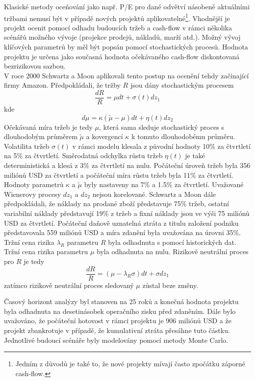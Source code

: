 \documentclass[a4paper]{book}
\begin{document}
Klasické metody oceňování jako např. P/E pro dané odvětví násobené aktuálními tržbami nemusí být v případě nových projektů aplikovatelné\footnote{Jedním z důvodů je také to, že nové projekty mívají často zpočátku záporné cash-flow.}. Vhodnější je projekt ocenit pomocí odhadu budoucích tržeb a cash-flow v rámci několika scénářů možného vývoje (projekce prodejů, nákladů, marží atd.). Možný vývoj klíčových parametrů by měl být popsán pomocí stochastických procesů. Hodnota projektu je určena jako současná hodnota očekávaného cash-flow diskontovaná bezrizikovou sazbou.\\

V roce 2000 Schwartz a Moon aplikovali tento postup na ocenění tehdy začínající firmy Amazon. Předpokládali, že tržby $R$ jsou dány stochastickým procesem
\begin{equation*}
\frac{dR}{R}=\mu dt + \sigma(t)dz_1
\end{equation*}
kde
\begin{equation*}
d \mu = \kappa(\tilde{\mu} - \mu)dt + \eta(t)dz_2
\end{equation*}
Očekávaná míra tržeb je tedy $\mu$, která sama sleduje stochastický proces s dlouhodobým průměrem $\tilde{\mu}$ a kovergencí $\kappa$ k tomuto dlouhodobému průměru. Volatilita tržeb $\sigma(t)$ v rámci modelu klesala z původní hodnoty 10\% za čtvrtletí na 5\% za čtvrtletí. Směrodatná odchylka růstu tržeb $\eta(t)$ je také deterministická a klesá z 3\% za čtvrtletí na nulu. Počáteční úroveň tržeb byla 356 miliónů USD za čtvrtletí a počáteční míra růstu tržeb byla 11\% za čtvrtletí. Hodnoty parametrů $\kappa$ a $\tilde{\mu}$ byly nastaveny na 7\% a 1.5\% za čtvrtletí. Uvažované Wienerovy procesy $dz_1$ a $dz_2$ nejsou korelované. Schwartz a Moon dále předpokládali, že náklady na prodané zboží představuje 75\% tržeb, ostatní variabilní náklady představují 19\% z tržeb a fixní náklady jsou ve výši 75 miliónů USD za čtvrtletí. Počáteční daňově uznatelná ztráta z titulu založení podniku představovala 559 miliónů USD a míra zdanění byla uvažována na úrovni 35\%. Tržní cena rizika $\lambda_R$ parametru $R$ byla odhadnuta s pomocí historických dat. Tržní cena rizika parametru $\mu$ byla odhadnuta na nulu. Rizikově neutrální proces pro $R$ je tedy
\begin{equation*}
\frac{d R}{R} = (\mu - \lambda_R \sigma)dt + \sigma dz_1
\end{equation*}
zatímco rizikově neutrální proces sledovaný $\mu$ zůstal beze změny.

Časový horizont analýzy byl stanoven na 25 roků a konečná hodnota projektu byla odhadnuta na desetinásobek operačního zisku před zdaněním. Dále bylo uvažováno, že počáteční hotovost v rámci projektu je 906 miliónů USD a že projekt zbankrotuje v případě, že kumulativní ztráta přesáhne tuto částku. Jednotlivé budoucí scénáře byly modelovány pomocí metody Monte Carlo.
\end{document}

